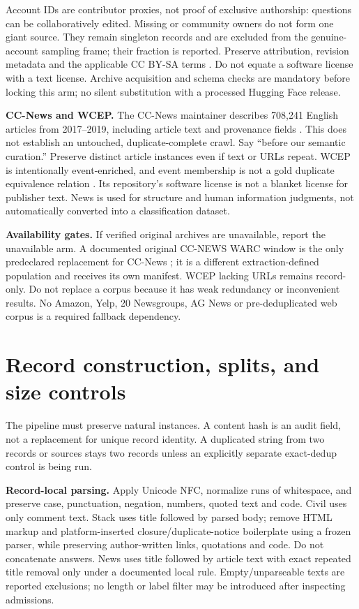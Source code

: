 \documentclass[11pt,a4paper]{article}
\begin{document}
Account IDs are contributor proxies, not proof of exclusive authorship: questions can be collaboratively edited. Missing or community owners do not form one giant source. They remain singleton records and are excluded from the genuine-account sampling frame; their fraction is reported. Preserve attribution, revision metadata and the applicable CC BY-SA terms \cite{selicense}. Do not equate a software license with a text license. Archive acquisition and schema checks are mandatory before locking this arm; no silent substitution with a processed Hugging Face release.

\textbf{CC-News and WCEP.} The CC-News maintainer describes 708,241 English articles from 2017--2019, including article text and provenance fields \cite{ccnews}. This does not establish an untouched, duplicate-complete crawl. Say ``before our semantic curation.'' Preserve distinct article instances even if text or URLs repeat. WCEP is intentionally event-enriched, and event membership is not a gold duplicate equivalence relation \cite{wcep,wceprepo}. Its repository's software license is not a blanket license for publisher text. News is used for structure and human information judgments, not automatically converted into a classification dataset.

\textbf{Availability gates.} If verified original archives are unavailable, report the unavailable arm. A documented original CC-NEWS WARC window is the only predeclared replacement for CC-News \cite{ccrawl}; it is a different extraction-defined population and receives its own manifest. WCEP lacking URLs remains record-only. Do not replace a corpus because it has weak redundancy or inconvenient results. No Amazon, Yelp, 20 Newsgroups, AG News or pre-deduplicated web corpus is a required fallback dependency.

\section{Record construction, splits, and size controls}
The pipeline must preserve natural instances. A content hash is an audit field, not a replacement for unique record identity. A duplicated string from two records or sources stays two records unless an explicitly separate exact-dedup control is being run.

\textbf{Record-local parsing.} Apply Unicode NFC, normalize runs of whitespace, and preserve case, punctuation, negation, numbers, quoted text and code. Civil uses only comment text. Stack uses title followed by parsed body; remove HTML markup and platform-inserted closure/duplicate-notice boilerplate using a frozen parser, while preserving author-written links, quotations and code. Do not concatenate answers. News uses title followed by article text with exact repeated title removal only under a documented local rule. Empty/unparseable texts are reported exclusions; no length or label filter may be introduced after inspecting admissions.
\end{document}
